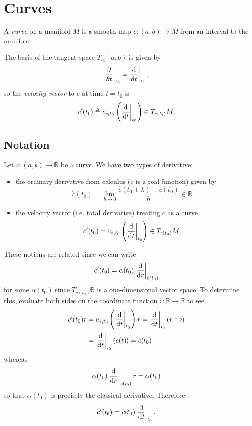 \section{Curves}
\begin{defn}[Curve]
A \emph{curve} on a manifold $M$ is a smooth map
$c: (a, b) \to M$ from an interval to the manifold.
\end{defn}

The basis of the tangent space $T_{t_0} (a, b)$ is given by
$$
  \left.\frac{\partial}{\partial t}\right|_{t_0}
= \left.\frac{\mathop{}\!\mathrm{d}}{\mathop{}\!\mathrm{d} t}\right|_{t_0},
$$
so the \emph{velocity vector} to $c$ at time $t = t_0$ is
$$
           c^\prime(t_0)
\triangleq c_{\ast, t_0}
             \left(
               \left.\frac{\mathop{}\!\mathrm{d}}{\mathop{}\!\mathrm{d} t}\right|_{t_0}
             \right)
\in T_{c(t_0)} M.
$$

\subsection{Notation}
Let $c: (a, b) \to \mathbb{R}$ be a curve. We have two types of
derivative:
\begin{itemize}
  \item{
    the ordinary derivative from calculus ($c$ is a real function) given by
    $$
      \dot{c}(t_0)
    = \lim_{h \to 0}
        \frac{c(t_0 + h) - c(t_0)}{h}
    \in \mathbb{R}
    $$
  }
  \item{
    the velocity vector (i.e. total derivative) treating $c$ as a
    curve
    $$
      c^\prime(t_0)
    = c_{\ast, t_0}
        \left(
          \left.\frac{\mathop{}\!\mathrm{d}}{\mathop{}\!\mathrm{d} t}\right|_{t_0}
        \right)
    \in T_{c(t_0)} M.
    $$
  }
\end{itemize}
These notions are related since we can write
$$
  c^\prime(t_0)
= \alpha(t_0)
  \left.\frac{\mathop{}\!\mathrm{d}}{\mathop{}\!\mathrm{d} r}\right|_{c(t_0)}
$$
for some $\alpha(t_0)$ since $T_{c(t_0)}\mathbb{R}$ is a
one-dimensional vector space.
To determine this, evaluate both sides on the coordinate function
$r: \mathbb{R} \to \mathbb{R}$ to see
\begin{align*}
   c^\prime(t_0) r
&= c_{\ast, t_0}
     \left(
       \left.\frac{\mathop{}\!\mathrm{d}}{\mathop{}\!\mathrm{d} t}\right|_{t_0}
     \right) r
 = \left.\frac{\mathop{}\!\mathrm{d}}{\mathop{}\!\mathrm{d} t}\right|_{t_0} (r \circ c) \\
&= \left.\frac{\mathop{}\!\mathrm{d}}{\mathop{}\!\mathrm{d} t}\right|_{t_0} (c(t))
 = \dot{c}(t_0)
\end{align*}
whereas
$$
  \alpha(t_0)
  \left.\frac{\mathop{}\!\mathrm{d}}{\mathop{}\!\mathrm{d} r}\right|_{c(t_0)} r
= \alpha(t_0)
$$
so that $\alpha(t_0)$ is precisely the classical derivative. Therefore
$$
  c^\prime(t_0)
= \dot{c}(t_0)
  \left.
    \frac{\mathop{}\!\mathrm{d}}{\mathop{}\!\mathrm{d} t}
  \right|_{t_0}.
$$

